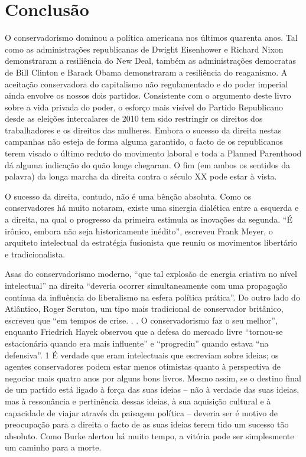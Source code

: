\chapter{Conclusão}\label{Conclusão}
 \par 
O conservadorismo dominou a política americana nos últimos quarenta anos. Tal como as administrações republicanas de Dwight Eisenhower e Richard Nixon demonstraram a resiliência do New Deal, também as administrações democratas de Bill Clinton e Barack Obama demonstraram a resiliência do reaganismo. A aceitação conservadora do capitalismo não regulamentado e do poder imperial ainda envolve os nossos dois partidos. Consistente com o argumento deste livro sobre a vida privada do poder, o esforço mais visível do Partido Republicano desde as eleições intercalares de 2010 tem sido restringir os direitos dos trabalhadores e os direitos das mulheres. Embora o sucesso da direita nestas campanhas não esteja de forma alguma garantido, o facto de os republicanos terem visado o último reduto do movimento laboral e toda a Planned Parenthood dá alguma indicação do quão longe chegaram. O fim (em ambos os sentidos da palavra) da longa marcha da direita contra o século XX pode estar à vista.
 \par 
O sucesso da direita, contudo, não é uma bênção absoluta. Como os conservadores há muito notaram, existe uma sinergia dialética entre a esquerda e a direita, na qual o progresso da primeira estimula as inovações da segunda. “É irônico, embora não seja historicamente inédito”, escreveu Frank Meyer, o arquiteto intelectual da estratégia fusionista que reuniu os movimentos libertário e tradicionalista.
 \par 
Asas do conservadorismo moderno, “que tal explosão de energia criativa no nível intelectual” na direita “deveria ocorrer simultaneamente com uma propagação contínua da influência do liberalismo na esfera política prática”. Do outro lado do Atlântico, Roger Scruton, um tipo mais tradicional de conservador britânico, escreveu que “em tempos de crise. . . O conservadorismo faz o seu melhor”, enquanto Friedrich Hayek observou que a defesa do mercado livre “tornou-se estacionária quando era mais influente” e “progrediu” quando estava “na defensiva”. {\color{blue}1} É verdade que eram intelectuais que escreviam sobre ideias; os agentes conservadores podem estar menos otimistas quanto à perspectiva de negociar mais quatro anos por alguns bons livros. Mesmo assim, se o destino final de um partido está ligado à força das suas ideias – não à verdade das suas ideias, mas à ressonância e pertinência dessas ideias, à sua aquisição cultural e à capacidade de viajar através da paisagem política – deveria ser é motivo de preocupação para a direita o facto de as suas ideias terem tido um sucesso tão absoluto. Como Burke alertou há muito tempo, a vitória pode ser simplesmente um caminho para a morte.
